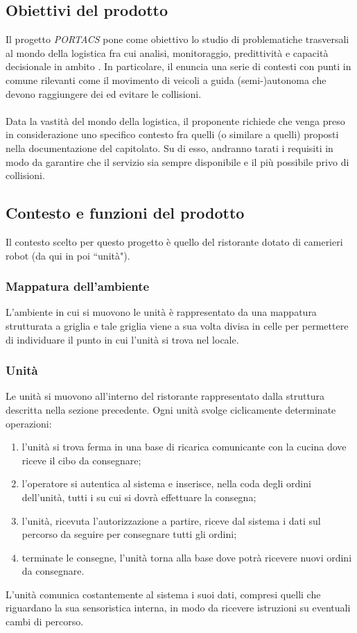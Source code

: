 \subsection{Obiettivi del prodotto}
Il progetto \textit{PORTACS} pone come obiettivo lo studio di problematiche trasversali al mondo della logistica fra cui analisi, monitoraggio, predittività e capacità decisionale in ambito . In particolare, il  enuncia una serie di contesti con punti in comune rilevanti come il movimento di veicoli a guida (semi-)autonoma che devono raggiungere dei  ed evitare le collisioni.
\\\\
Data la vastità del mondo della logistica, il proponente richiede che venga preso in considerazione uno specifico contesto fra quelli (o similare a quelli) proposti nella documentazione del capitolato. Su di esso, andranno tarati i requisiti in modo da garantire che il servizio sia sempre disponibile e il più possibile privo di collisioni.

\subsection{Contesto e funzioni del prodotto}
Il contesto scelto per questo progetto è quello del ristorante dotato di camerieri robot (da qui in poi ``unità").
	\subsubsection{Mappatura dell'ambiente}    
    L'ambiente in cui si muovono le unità è rappresentato da una mappatura strutturata a griglia e tale griglia viene a sua volta divisa in celle per permettere di individuare il punto in cui l'unità si trova nel locale.
    \subsubsection{Unità}
    Le unità si muovono all'interno del ristorante rappresentato dalla struttura descritta nella sezione precedente. Ogni unità svolge ciclicamente determinate operazioni:
    \begin{enumerate}
        \item l'unità si trova ferma in una base di ricarica comunicante con la cucina dove riceve il cibo da consegnare;
        \item l'operatore si autentica al sistema e inserisce, nella coda degli ordini dell'unità, tutti i  su cui si dovrà effettuare la consegna;
        \item l'unità, ricevuta l'autorizzazione a partire, riceve dal sistema i dati sul percorso da seguire per consegnare tutti gli ordini;
        \item terminate le consegne, l'unità torna alla base dove potrà ricevere nuovi ordini da consegnare.
    \end{enumerate}
    L'unità comunica costantemente al sistema i suoi dati, compresi quelli che riguardano la sua sensoristica interna, in modo da ricevere istruzioni su eventuali cambi di percorso.

